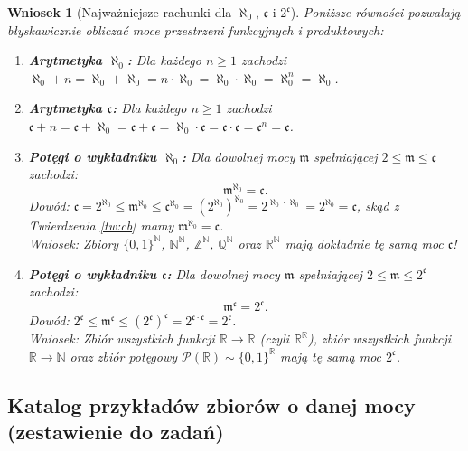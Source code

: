 \documentclass[11pt, a4paper]{article}
\theoremstyle{definition}
\theoremstyle{plain}
\newtheorem{wniosek}[definicja]{Wniosek}
\theoremstyle{remark}
\begin{document}
\begin{wniosek}[Najważniejsze rachunki dla $\aleph_0$, $\mathfrak{c}$ i $2^{\mathfrak{c}}$]\label{wn:rachunki}
Poniższe równości pozwalają błyskawicznie obliczać moce przestrzeni funkcyjnych i produktowych:
\begin{enumerate}
    \item \textbf{Arytmetyka $\aleph_0$:} Dla każdego $n \ge 1$ zachodzi $\aleph_0 + n = \aleph_0 + \aleph_0 = n \cdot \aleph_0 = \aleph_0 \cdot \aleph_0 = \aleph_0^n = \aleph_0$.
    \item \textbf{Arytmetyka $\mathfrak{c}$:} Dla każdego $n \ge 1$ zachodzi $\mathfrak{c} + n = \mathfrak{c} + \aleph_0 = \mathfrak{c} + \mathfrak{c} = \aleph_0 \cdot \mathfrak{c} = \mathfrak{c} \cdot \mathfrak{c} = \mathfrak{c}^n = \mathfrak{c}$.
    \item \textbf{Potęgi o wykładniku $\aleph_0$:} Dla dowolnej mocy $\mathfrak{m}$ spełniającej $2 \le \mathfrak{m} \le \mathfrak{c}$ zachodzi:
    \[
        \mathfrak{m}^{\aleph_0} = \mathfrak{c}.
    \]
    \emph{Dowód:} $\mathfrak{c} = 2^{\aleph_0} \le \mathfrak{m}^{\aleph_0} \le \mathfrak{c}^{\aleph_0} = (2^{\aleph_0})^{\aleph_0} = 2^{\aleph_0 \cdot \aleph_0} = 2^{\aleph_0} = \mathfrak{c}$, skąd z Twierdzenia \ref{tw:cb} mamy $\mathfrak{m}^{\aleph_0} = \mathfrak{c}$.\\
    \emph{Wniosek:} Zbiory $\{0, 1\}^{\mathbb{N}}$, $\mathbb{N}^{\mathbb{N}}$, $\mathbb{Z}^{\mathbb{N}}$, $\mathbb{Q}^{\mathbb{N}}$ oraz $\mathbb{R}^{\mathbb{N}}$ mają dokładnie tę samą moc $\mathfrak{c}$!
    \item \textbf{Potęgi o wykładniku $\mathfrak{c}$:} Dla dowolnej mocy $\mathfrak{m}$ spełniającej $2 \le \mathfrak{m} \le 2^{\mathfrak{c}}$ zachodzi:
    \[
        \mathfrak{m}^{\mathfrak{c}} = 2^{\mathfrak{c}}.
    \]
    \emph{Dowód:} $2^{\mathfrak{c}} \le \mathfrak{m}^{\mathfrak{c}} \le (2^{\mathfrak{c}})^{\mathfrak{c}} = 2^{\mathfrak{c} \cdot \mathfrak{c}} = 2^{\mathfrak{c}}$.\\
    \emph{Wniosek:} Zbiór wszystkich funkcji $\mathbb{R} \to \mathbb{R}$ (czyli $\mathbb{R}^{\mathbb{R}}$), zbiór wszystkich funkcji $\mathbb{R} \to \mathbb{N}$ oraz zbiór potęgowy $\mathcal{P}(\mathbb{R}) \sim \{0, 1\}^{\mathbb{R}}$ mają tę samą moc $2^{\mathfrak{c}}$.
\end{enumerate}
\end{wniosek}

\subsection{Katalog przykładów zbiorów o danej mocy (zestawienie do zadań)}
\end{document}
